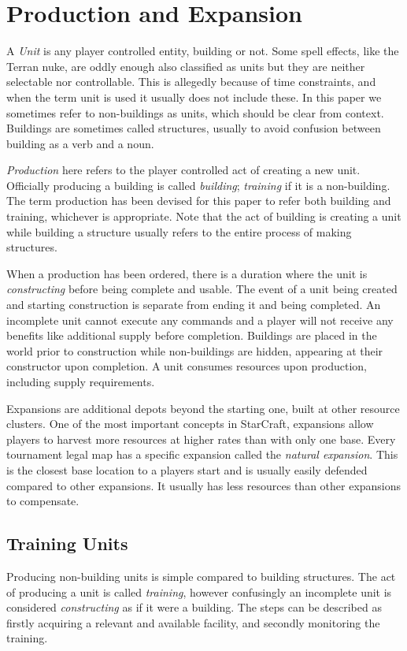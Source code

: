 \chapter{Production and Expansion}
A \emph{Unit} is any player controlled entity, building or not. Some spell effects, like the Terran nuke, are oddly enough also classified as units but they are neither selectable nor controllable. This is allegedly because of time constraints, and when the term unit is used it usually does not include these. %
In this paper we sometimes refer to non-buildings as units, which should be clear from context. Buildings are sometimes called structures, usually to avoid confusion between building as a verb and a noun.

\emph{Production} here refers to the player controlled act of creating a new unit. Officially producing a building is called \emph{building}; \emph{training} if it is a non-building. The term production has been devised for this paper to refer both building and training, whichever is appropriate. Note that the act of building is creating a unit while building a structure usually refers to the entire process of making structures.

When a production has been ordered, there is a duration where the unit is \emph{constructing} before being complete and usable. The event of a unit being created and starting construction is separate from ending it and being completed. An incomplete unit cannot execute any commands and a player will not receive any benefits like additional supply before completion. Buildings are placed in the world prior to construction while non-buildings are hidden, appearing at their constructor upon completion. A unit consumes resources upon production, including supply requirements.

Expansions are additional depots beyond the starting one, built at other resource clusters. One of the most important concepts in StarCraft, expansions allow players to harvest more resources at higher rates than with only one base. Every tournament legal map has a specific expansion called the \emph{natural expansion}. This is the closest base location to a players start and is usually easily defended compared to other expansions. It usually has less resources than other expansions to compensate.

\section{Training Units}
Producing non-building units is simple compared to building structures. The act of producing a unit is called \emph{training}, however confusingly an incomplete unit is considered \emph{constructing} as if it were a building. The steps can be described as firstly acquiring a relevant and available facility, and secondly monitoring the training.

